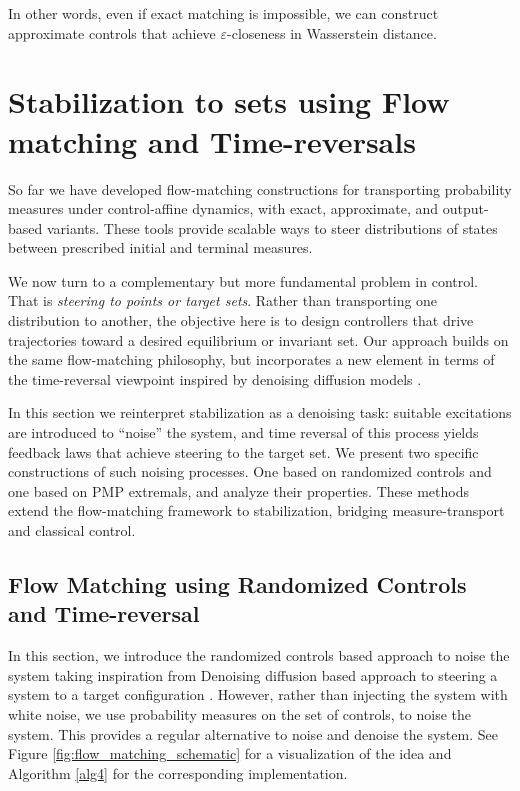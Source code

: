 \documentclass{article}
\begin{document}
In other words, even if exact matching is impossible, we can construct approximate controls that achieve $\varepsilon$-closeness in Wasserstein distance.

\section{Stabilization to sets using Flow matching and Time-reversals}

So far we have developed flow-matching constructions for transporting probability measures under control-affine dynamics, with exact, approximate, and output-based variants. These tools provide scalable ways to steer distributions of states between prescribed initial and terminal measures.  

We now turn to a complementary but more fundamental problem in control. That is \emph{steering to points or target sets}. Rather than transporting one distribution to another, the objective here is to design controllers that drive trajectories toward a desired equilibrium or invariant set. Our approach builds on the same flow-matching philosophy, but incorporates a new element in terms of the time-reversal viewpoint inspired by denoising diffusion models \cite{song2020score}.  

In this section we reinterpret stabilization as a denoising task: suitable excitations are introduced to ``noise'' the system, and time reversal of this process yields feedback laws that achieve steering to the target set. We present two specific constructions of such noising processes. One based on randomized controls and one based on PMP extremals, and analyze their properties. These methods extend the flow-matching framework to stabilization, bridging measure-transport and classical control.

\subsection{Flow Matching using Randomized Controls and Time-reversal}

In this section, we introduce the randomized controls based approach to noise the system taking inspiration from Denoising diffusion based approach to steering a system to a target configuration \cite{elamvazhuthi2025score,mei2025flow}. However, rather than injecting the system with white noise, we use probability measures on the set of controls, to noise the system. This provides a regular alternative to noise and denoise the system. See Figure \ref{fig:flow_matching_schematic}
 for a visualization of the idea and Algorithm \ref{alg4} for the corresponding implementation.
\end{document}
